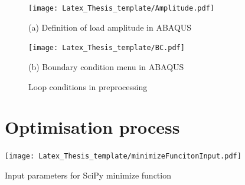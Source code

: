  

     \begin{figure}[H]
        \centering
        \begin{minipage}[T!]{1.0\textwidth}
            \centering
            \begin{minipage}[T!][9cm][T!]{0.35\textwidth}
                \texttt{[image: Latex\_Thesis\_template/Amplitude.pdf]}
                \vfill{}
                \caption*{(a) Definition of load amplitude in ABAQUS}
                \label{fig:amplitudemenu}
            \end{minipage}
            \hspace{0.08\textwidth} %
            \begin{minipage}[T!][9cm][T!]{0.35\textwidth}
                \texttt{[image: Latex\_Thesis\_template/BC.pdf]}
                \vfill{}
                \caption*{(b) Boundary condition menu in ABAQUS}
                \label{fig:bcmenu}
            \end{minipage}
        \end{minipage}    
        \caption{Loop conditions in preprocessing}
        \label{tab:modelSettings}
	\end{figure}
 
    \section{Optimisation process}

     \begin{table}[H]
		\centering
        \texttt{[image: Latex\_Thesis\_template/minimizeFuncitonInput.pdf]}
		\caption{Input parameters for SciPy minimize function}
		\label{tab:minimizeFunctionInput}
	\end{table}

